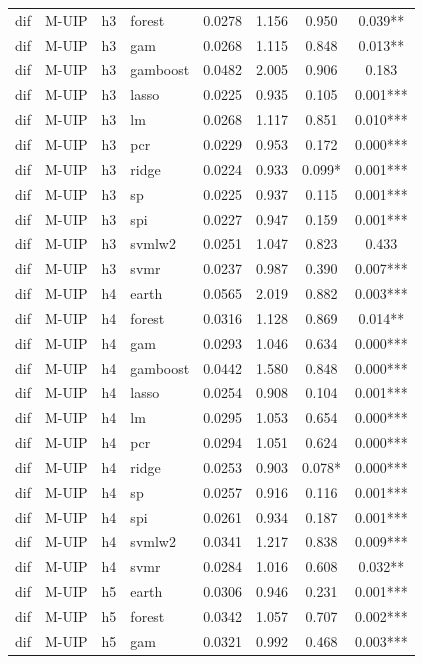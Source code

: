 \begin{ThreePartTable}
\begin{longtable}[t]{llclcccc}
dif & M-UIP & h3 & forest & 0.0278 & 1.156 & 0.950 & 0.039**\\
dif & M-UIP & h3 & gam & 0.0268 & 1.115 & 0.848 & 0.013**\\
dif & M-UIP & h3 & gamboost & 0.0482 & 2.005 & 0.906 & 0.183\\
dif & M-UIP & h3 & lasso & 0.0225 & 0.935 & 0.105 & 0.001***\\
dif & M-UIP & h3 & lm & 0.0268 & 1.117 & 0.851 & 0.010***\\
dif & M-UIP & h3 & pcr & 0.0229 & 0.953 & 0.172 & 0.000***\\
dif & M-UIP & h3 & ridge & 0.0224 & 0.933 & 0.099* & 0.001***\\
dif & M-UIP & h3 & sp & 0.0225 & 0.937 & 0.115 & 0.001***\\
dif & M-UIP & h3 & spi & 0.0227 & 0.947 & 0.159 & 0.001***\\
dif & M-UIP & h3 & svmlw2 & 0.0251 & 1.047 & 0.823 & 0.433\\
dif & M-UIP & h3 & svmr & 0.0237 & 0.987 & 0.390 & 0.007***\\
\addlinespace
dif & M-UIP & h4 & earth & 0.0565 & 2.019 & 0.882 & 0.003***\\
dif & M-UIP & h4 & forest & 0.0316 & 1.128 & 0.869 & 0.014**\\
dif & M-UIP & h4 & gam & 0.0293 & 1.046 & 0.634 & 0.000***\\
dif & M-UIP & h4 & gamboost & 0.0442 & 1.580 & 0.848 & 0.000***\\
dif & M-UIP & h4 & lasso & 0.0254 & 0.908 & 0.104 & 0.001***\\
dif & M-UIP & h4 & lm & 0.0295 & 1.053 & 0.654 & 0.000***\\
dif & M-UIP & h4 & pcr & 0.0294 & 1.051 & 0.624 & 0.000***\\
dif & M-UIP & h4 & ridge & 0.0253 & 0.903 & 0.078* & 0.000***\\
dif & M-UIP & h4 & sp & 0.0257 & 0.916 & 0.116 & 0.001***\\
dif & M-UIP & h4 & spi & 0.0261 & 0.934 & 0.187 & 0.001***\\
dif & M-UIP & h4 & svmlw2 & 0.0341 & 1.217 & 0.838 & 0.009***\\
dif & M-UIP & h4 & svmr & 0.0284 & 1.016 & 0.608 & 0.032**\\
\addlinespace
dif & M-UIP & h5 & earth & 0.0306 & 0.946 & 0.231 & 0.001***\\
dif & M-UIP & h5 & forest & 0.0342 & 1.057 & 0.707 & 0.002***\\
dif & M-UIP & h5 & gam & 0.0321 & 0.992 & 0.468 & 0.003***\\

\end{longtable}
\end{ThreePartTable}
